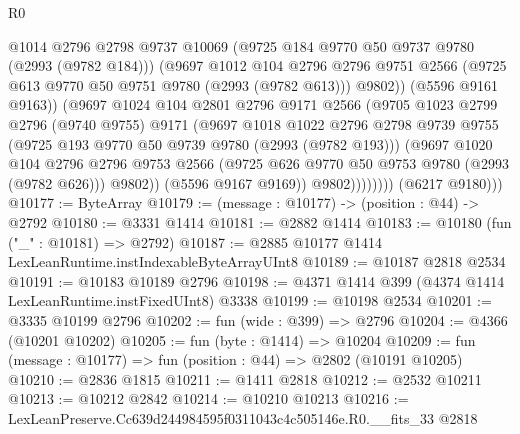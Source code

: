 \begin{lexlean}{R0}
\begin{coremodule}
                          @1014
                          @2796
                          @2798
                          @9737
                          @10069
                          (@9725 @184 @9770 @50 @9737 @9780 (@2993 (@9782 @184)))
                          (@9697
                            @1012
                            @104
                            @2796
                            @2796
                            @9751
                            @2566
                            (@9725 @613 @9770 @50 @9751 @9780 (@2993 (@9782 @613)))
                            @9802))
                        (@5596 @9161 @9163))
                      (@9697
                        @1024
                        @104
                        @2801
                        @2796
                        @9171
                        @2566
                        (@9705
                          @1023
                          @2799
                          @2796
                          (@9740 @9755)
                          @9171
                          (@9697
                            @1018
                            @1022
                            @2796
                            @2798
                            @9739
                            @9755
                            (@9725 @193 @9770 @50 @9739 @9780 (@2993 (@9782 @193)))
                            (@9697
                              @1020
                              @104
                              @2796
                              @2796
                              @9753
                              @2566
                              (@9725 @626 @9770 @50 @9753 @9780 (@2993 (@9782 @626)))
                              @9802))
                          (@5596 @9167 @9169))
                        @9802))))))))
        (@6217 @9180)))
@10177 := ByteArray
@10179 := (message : @10177) -> (position : @44) -> @2792
@10180 := @3331 @1414
@10181 := @2882 @1414
@10183 := @10180 (fun ("_" : @10181) => @2792)
@10187 := @2885 @10177 @1414 LexLeanRuntime.instIndexableByteArrayUInt8
@10189 := @10187 @2818 @2534
@10191 := @10183 @10189 @2796
@10198 := @4371 @1414 @399 (@4374 @1414 LexLeanRuntime.instFixedUInt8) @3338
@10199 := @10198 @2534
@10201 := @3335 @10199 @2796
@10202 := fun (wide : @399) => @2796
@10204 := @4366 (@10201 @10202)
@10205 := fun (byte : @1414) => @10204
@10209 := fun (message : @10177) => fun (position : @44) => @2802 (@10191 @10205)
@10210 := @2836 @1815
@10211 := @1411 @2818
@10212 := @2532 @10211
@10213 := @10212 @2842
@10214 := @10210 @10213
@10216 := LexLeanPreserve.Cc639d244984595f0311043c4c505146e.R0.__fits_33 @2818

\end{coremodule}
\end{lexlean}

